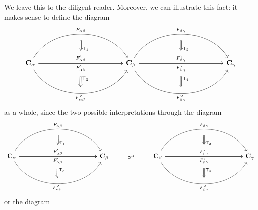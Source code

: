 We leave this to the diligent reader.
Moreover, we can illustrate this fact: it makes sense to define the diagram
\[
\begin{tikzcd}[row sep=huge, column sep=6em]
  \mathbf{C}_{\alpha}
  \arrow[bend left=60]{rr}[name=fab]{F_{\alpha\beta}}
  \arrow[swap]{rr}[name=fab*1]{F_{\alpha\beta}^{\backprime}}
  \arrow{rr}[name=fab*2]{F_{\alpha\beta}^{\backprime}}
  \arrow[bend right=60,swap]{rr}[name=fab**]{F_{\alpha\beta}^{\backprime\backprime}}
  &
  &
  \mathbf{C}_{\beta}
  \arrow[bend left=60]{rr}[name=fbc]{F_{\beta\gamma}}
  \arrow[swap]{rr}[name=fbc*1]{F_{\beta\gamma}^{\backprime}}
  \arrow{rr}[name=fbc*2]{F_{\beta\gamma}^{\backprime}}
  \arrow[bend right=60,swap]{rr}[name=fbc**]{F_{\beta\gamma}^{\backprime\backprime}}
  &
  &
  \mathbf{C}_{\gamma}
  \arrow[from=fab,to=fab*1,shorten <= 9pt,shorten >= 18pt,Rightarrow]{d}{\mathsf{T}_{1}}
  \arrow[from=fab*2,to=fab**,shorten <= 18pt,shorten >= 9pt,Rightarrow]{d}{\mathsf{T}_{3}}
  \arrow[from=fbc,to=fbc*1,shorten <= 9pt,shorten >= 18pt,Rightarrow]{d}{\mathsf{T}_{2}}
  \arrow[from=fbc*2,to=fbc**,shorten <= 18pt,shorten >= 9pt,Rightarrow]{d}{\mathsf{T}_{4}}
\end{tikzcd}
\]
as a whole, since the two possible interpretations through the diagram
\[
\begin{tikzcd}[row sep=huge, column sep=6em]
  \mathbf{C}_{\alpha}
  \arrow[bend left=60]{rr}[name=fab]{F_{\alpha\beta}}
  \arrow[swap]{rr}[name=fab*1]{F_{\alpha\beta}^{\backprime}}
  \arrow{rr}[name=fab*2]{F_{\alpha\beta}^{\backprime}}
  \arrow[bend right=60,swap]{rr}[name=fab**]{F_{\alpha\beta}^{\backprime\backprime}}
  &
  &
  \mathbf{C}_{\beta}
  \arrow[phantom]{r}{\circ^{\textrm{h}}}
  &
  \mathbf{C}_{\beta}
  \arrow[bend left=60]{rr}[name=fbc]{F_{\beta\gamma}}
  \arrow[swap]{rr}[name=fbc*1]{F_{\beta\gamma}^{\backprime}}
  \arrow{rr}[name=fbc*2]{F_{\beta\gamma}^{\backprime}}
  \arrow[bend right=60,swap]{rr}[name=fbc**]{F_{\beta\gamma}^{\backprime\backprime}}
  &
  &
  \mathbf{C}_{\gamma}
  \arrow[from=fab,to=fab*1,shorten <= 9pt,shorten >= 18pt,Rightarrow]{d}{\mathsf{T}_{1}}
  \arrow[from=fab*2,to=fab**,shorten <= 18pt,shorten >= 9pt,Rightarrow]{d}{\mathsf{T}_{3}}
  \arrow[from=fbc,to=fbc*1,shorten <= 9pt,shorten >= 18pt,Rightarrow]{d}{\mathsf{T}_{2}}
  \arrow[from=fbc*2,to=fbc**,shorten <= 18pt,shorten >= 9pt,Rightarrow]{d}{\mathsf{T}_{4}}
\end{tikzcd}
\]
or the diagram
